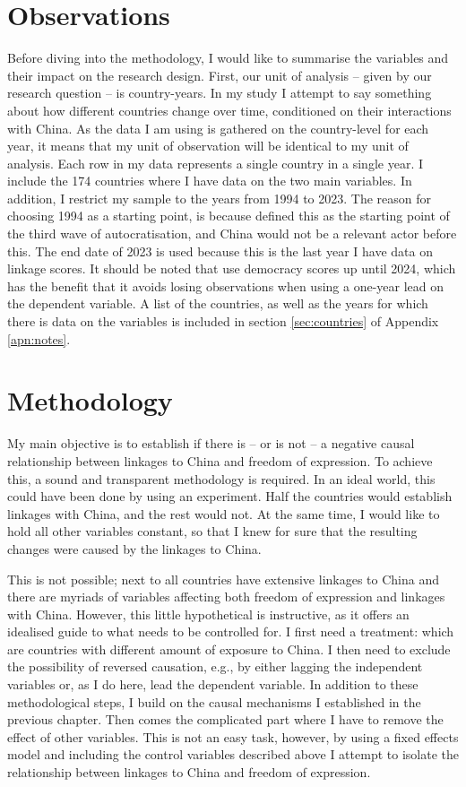\section{Observations}
Before diving into the methodology, I would like to summarise the variables and their impact on the research design. First, our unit of analysis -- given by our research question -- is country-years. In my study I attempt to say something about how different countries change over time,  conditioned on their interactions with China. As the data I am using is gathered on the country-level for each year, it means that my unit of observation will be identical to my unit of analysis. Each row in my data represents a single country in a single year. I include the 174 countries where I have data on the two main variables. In addition, I restrict my sample to the years from 1994 to 2023. The reason for choosing 1994 as a starting point, is because \citet{luhrmann_third_2019} defined this as the starting point of the third wave of autocratisation, and China would not be a relevant actor before this. The end date of 2023 is used because this is the last year I have data on linkage scores. It should be noted that use democracy scores up until 2024,  which has the benefit that it avoids losing observations when using a one-year lead on the dependent variable. A list of the countries, as well as the years for which there is data on the variables is included in section \ref{sec:countries} of Appendix \ref{apn:notes}. 

\section{Methodology}
My main objective is to establish if there is -- or is not -- a negative causal relationship between linkages to China and freedom of expression. To achieve this, a sound and transparent methodology is required. In an ideal world, this could have been done by using an experiment. Half the countries would establish linkages with China, and the rest would not. At the same time, I would like to hold all other variables constant, so that I knew for sure that the resulting changes were caused by the linkages to China.

This is not possible; next to all countries have extensive linkages to China and there are myriads of variables affecting both freedom of expression and linkages with China. However, this little hypothetical is instructive, as it offers an idealised guide to what needs to be controlled for. I first need a treatment: which are countries with different amount of exposure to China. I then need to exclude the possibility of reversed causation, e.g., by either lagging the independent variables or, as I do here, lead the dependent variable. In addition to these methodological steps, I build on the causal mechanisms I established in the previous chapter. Then comes the complicated part where I have to remove the effect of other variables. This is not an easy task, however, by using a fixed effects model and including the control variables described above I attempt to isolate the relationship between linkages to China and freedom of expression.

